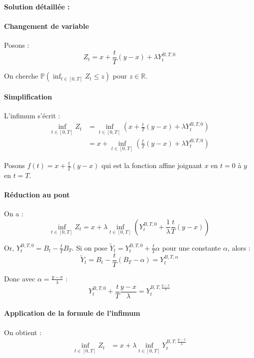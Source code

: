 \documentclass[12pt,a4paper]{article}
\theoremstyle{definition}
\theoremstyle{remark}
\newcommand{\R}{\mathbb{R}}
\newcommand{\Prob}{\mathbb{P}}
\begin{document}
\textbf{Solution détaillée :}

\paragraph{Changement de variable}

Posons :
\[
Z_t = x + \frac{t}{T}(y-x) + \lambda Y_t^{B,T,0}
\]

On cherche $\Prob(\inf_{t \in [0,T]} Z_t \leq z)$ pour $z \in \R$.

\paragraph{Simplification}

L'infimum s'écrit :
\begin{align*}
\inf_{t \in [0,T]} Z_t &= \inf_{t \in [0,T]} \left(x + \frac{t}{T}(y-x) + \lambda Y_t^{B,T,0}\right) \\
&= x + \inf_{t \in [0,T]} \left(\frac{t}{T}(y-x) + \lambda Y_t^{B,T,0}\right)
\end{align*}

Posons $f(t) = x + \frac{t}{T}(y-x)$ qui est la fonction affine joignant $x$ en $t=0$ à $y$ en $t=T$.

\paragraph{Réduction au pont}

On a :
\[
\inf_{t \in [0,T]} Z_t = x + \lambda \inf_{t \in [0,T]} \left(Y_t^{B,T,0} + \frac{1}{\lambda}\frac{t}{T}(y-x)\right)
\]

Or, $Y_t^{B,T,0} = B_t - \frac{t}{T}B_T$. Si on pose $\tilde{Y}_t = Y_t^{B,T,0} + \frac{t}{T}\alpha$ pour une constante $\alpha$, alors :
\[
\tilde{Y}_t = B_t - \frac{t}{T}(B_T - \alpha) = Y_t^{B,T,\alpha}
\]

Donc avec $\alpha = \frac{y-x}{\lambda}$ :
\[
Y_t^{B,T,0} + \frac{t}{T}\frac{y-x}{\lambda} = Y_t^{B,T,\frac{y-x}{\lambda}}
\]

\paragraph{Application de la formule de l'infimum}

On obtient :
\begin{align*}
\inf_{t \in [0,T]} Z_t &= x + \lambda \inf_{t \in [0,T]} Y_t^{B,T,\frac{y-x}{\lambda}}
\end{align*}
\end{document}
